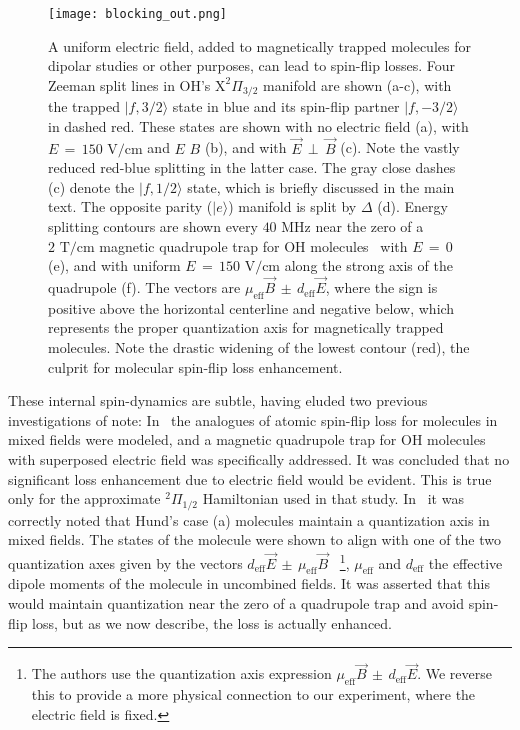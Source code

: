 \documentclass[%
 reprint,
 amsmath,amssymb,
 aps,
prl,
]{revtex4-1}
\newcommand{\epb}{{$\vec{E}\,{\perp}\,\vec{B}$}}
\begin{document}
\begin{figure}[tb]
\texttt{[image: blocking\_out.png]}%
\caption{
A uniform electric field, added to magnetically trapped molecules for dipolar studies or other purposes, can lead to spin-flip losses. 
Four Zeeman split lines in OH's $\mathrm{X}^2\Pi_{3/2}$ manifold are shown (a-c), with the trapped $|f,3/2\rangle$ state in blue and its spin-flip partner $|f,-3/2\rangle$ in dashed red. 
These states are shown with no electric field (a), with $E\,{=}\,150\text{ V/cm}$ and $E\,$\raisebox{1px}{${\parallel}$}$\,B$ (b), and with \epb{} (c). 
Note the vastly reduced red-blue splitting in the latter case. 
The gray close dashes (c) denote the $|f,1/2\rangle$ state, which is briefly discussed in the main text.
The opposite parity ($|e\rangle$) manifold is split by $\Delta$ (d). 
Energy splitting contours are shown every $40\text{ MHz}$ near the zero of a $2\text{ T/cm}$ magnetic quadrupole trap for OH molecules~\cite{Stuhl2012uwave} with $E\,{=}\,0$ (e), and with uniform $E\,{=}\,150\text{ V/cm}$ along the strong axis of the quadrupole (f). 
The vectors are $\mu_\text{eff}\vec{B}\,{\pm}\, d_\text{eff}\vec{E}$, where the sign is positive above the horizontal centerline and negative below, which  represents the proper quantization axis for magnetically trapped molecules. 
Note the drastic widening of the lowest contour (red), the culprit for molecular spin-flip loss enhancement.
}
\label{fig:blocking}
\end{figure}

These internal spin-dynamics are subtle, having eluded two previous investigations of note: In~\cite{Lara2008} the analogues of atomic spin-flip loss for molecules in mixed fields were modeled, and a magnetic quadrupole trap for OH molecules with superposed electric field was specifically addressed. 
It was concluded that no significant loss enhancement due to electric field would be evident. 
This is true only for the approximate $^2\Pi_{1/2}$ Hamiltonian used in that study. 
In~\cite{Bohn2013} it was correctly noted that Hund's case (a) molecules maintain a quantization axis in mixed fields. 
The states of the molecule were shown to align with one of the two quantization axes given by the vectors $d_\text{eff}\vec{E} \,{\pm}\, \mu_\text{eff}\vec{B}$
~\footnote{The authors use the quantization axis expression $\mu_\text{eff}\vec{B} \,{\pm}\, d_\text{eff}\vec{E}$. We reverse this to provide a more physical connection to our experiment, where the electric field is fixed.}, $\mu_\text{eff}$ and $d_\text{eff}$ the effective dipole moments of the molecule in uncombined fields. 
It was asserted that this would maintain quantization near the zero of a quadrupole trap and avoid spin-flip loss, but as we now describe, the loss is actually enhanced.
\end{document}
